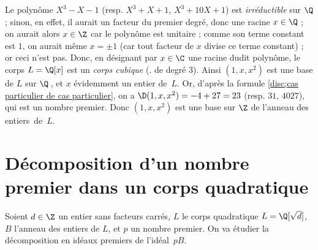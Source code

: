 \documentclass[11pt, useosf,
  title in boldface,
  theorem in new line,
  theorem numbering = section,
  number theorems separately,
]{simplivre}
\begin{document}
        \begin{example}
            Le polynôme \( X^3-X-1 \) (resp. \( X^3+X+1 \), \( X^3+10X+1 \)) est \emph{irréductible} sur \( \Q \) ; sinon, en effet, il aurait un facteur du premier degré, donc une racine \( x \in \Q \) ; on aurait alors \( x \in \Z \) car le polynôme est unitaire ; comme son terme constant est \( 1 \), on aurait même \( x = \pm 1 \) (car tout facteur de \( x \) divise ce terme constant) ; or ceci n'est pas. Donc, en désignant par \( x \in \C \) une racine dudit polynôme, le corps \( L = \Q[x] \) est un \emph{corps cubique} (\ie. de degré \( 3 \)). Ainsi \( (1, x, x^2) \) est une base de \( L \) sur \( \Q \)\,, et \( x \) évidemment un entier de~\( L \). Or, d'après la formule \eqref{disc;cas particulier de cas particulier}, on a \( \D(1,x,x^2) = -4+27 = 23 \) (resp. \( 31 \), \( 4027 \)), qui est un nombre premier. Donc \( (1, x, x^2) \) est une base sur \( \Z \) de l'anneau des entiers~de~\( L \).
        \end{example}

\section{Décomposition d'un nombre premier dans un corps quadratique}\label{sec:décomposition d'un nombre premier dans un corps quadratique}

    Soient \( d \in \Z \) un entier sans facteurs carrés, \( L \) le corps quadratique \( L = \Q[\sqrt{d}] \), \( B \) l'anneau des entiers de \( L \), et \( p \) un nombre premier. On va étudier la décomposition en idéaux premiers de l'idéal~\( pB \).
\end{document}
